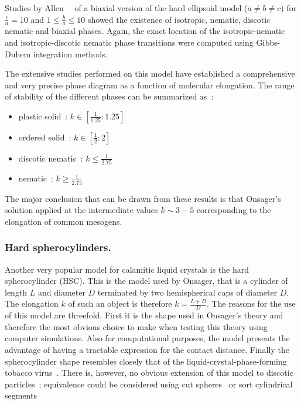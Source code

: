 Studies by Allen~\etal~\cite{Allen90,CampAllen97} of a biaxial version of the hard ellipsoid
model ($a \neq b \neq c$) for $\frac{c}{a} = 10$ and $1 \leq \frac{b}{a} \leq 10$ showed the
existence of isotropic, nematic, discotic nematic and biaxial phases. Again, the exact location of the
isotropic-nematic and isotropic-discotic nematic phase transitions were computed using
Gibbs-Duhem integration methods.

The extensive studies performed on this model have established a comprehensive and very precise 
phase diagram as a function of molecular elongation. The range of stability of the different
phases can be summarized as~:
%
\begin{itemize}
	\item plastic solid~: $k \in [\frac{1}{1.25}:1.25]$
	\item ordered solid~: $k \in [\frac{1}{2}:2]$
	\item discotic nematic~: $k \leq \frac{1}{2.75}$
	\item nematic~: $k \geq \frac{1}{2.75}$
\end{itemize}

The major conclusion that can be drawn from these results is that Onsager's solution applied
at the intermediate values $k\sim 3-5$ corresponding to the elongation of common mesogens. 

\subsubsection{Hard spherocylinders.}

Another very popular model for calamitic liquid crystals is the hard spherocylinder (HSC). This is the
model used by Onsager, that is a cylinder of length $L$ and diameter $D$ terminated by two 
hemispherical caps of diameter $D$. The elongation $k$ of such an object is therefore
$k=\frac{L+D}{D}$. The reasons for the use of this model are threefold. First it is the shape
used in Onsager's theory and therefore the most obvious choice to make when testing this theory 
using computer simulations. Also for computational purposes, the model presents the advantage of 
having a tractable expression 
for the contact distance. Finally the spherocylinder shape resembles closely that of the 
liquid-crystal-phase-forming tobacco virus~\cite{ZazadzinskiMeyer86,DogicFraden97}. There is,
however, no obvious extension of this model to discotic particles~; equivalence could be
considered using cut spheres~\cite{VeermanFrenkel92} or sort cylindrical 
segments~\cite{BatesFrenkel98}\\

